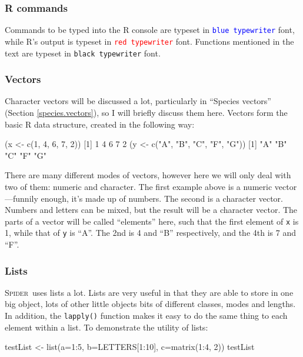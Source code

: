 \documentclass{article}
\newcommand{\spider}{\textsc{Spider}~} %
\newcommand{\progname}[1]{\textsc{#1}}
\newcommand{\fun}[1]{\texttt{#1}}
\begin{document}
\subsubsection{R commands}
Commands to be typed into the \progname{R} console are typeset in \texttt{\textcolor{blue}{blue typewriter}} font, while  \progname{R}'s output is typeset in \texttt{\textcolor{red}{red typewriter}} font. Functions mentioned in the text are typeset in \texttt{black typewriter} font.

\subsubsection{Vectors}
Character vectors will be discussed a lot, particularly in ``Species vectors'' (Section \ref{species.vectors}), so I will briefly discuss them here. Vectors form the basic \progname{R} data structure, created in the following way:

\begin{Rio}
(x <- c(1, 4, 6, 7, 2))
[1] 1 4 6 7 2
(y <- c("A", "B", "C", "F", "G"))
[1] "A" "B" "C" "F" "G"
\end{Rio}

There are many different modes of vectors, however here we will only deal with two of them: numeric and character. The first example above is a numeric vector---funnily enough, it's made up of numbers. The second is a character vector. Numbers and letters can be mixed, but the result will be a character vector. The parts of a vector will be called ``elements'' here, such that the first element of \fun{x} is 1, while that of \fun{y} is ``A''. The 2nd is 4 and ``B'' respectively, and the 4th is 7 and ``F''.

\subsubsection{Lists}
\spider uses lists a lot. Lists are very useful in that they are able to store in one big object, lots of other little objects bits of different classes, modes and lengths. In addition, the \fun{lapply()} function makes it easy to do the same thing to each element within a list. To demonstrate the utility of lists:

\begin{console}
testList <- list(a=1:5, b=LETTERS[1:10], c=matrix(1:4, 2))
testList
\end{console}

\end{document}
